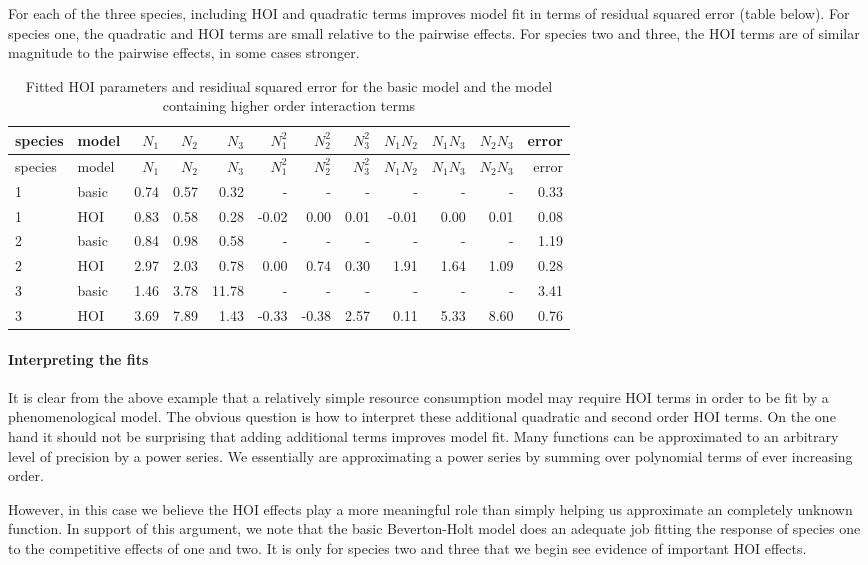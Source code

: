 \documentclass[12pt,]{article}
\let\oldparagraph\paragraph
\renewcommand{\paragraph}[1]{\oldparagraph{#1}\mbox{}}
\begin{document}
For each of the three species, including HOI and quadratic terms
improves model fit in terms of residual squared error (table below). For
species one, the quadratic and HOI terms are small relative to the
pairwise effects. For species two and three, the HOI terms are of
similar magnitude to the pairwise effects, in some cases stronger.

\begin{longtable}[]{@{}llrrrrrrrrrr@{}}
\caption{Fitted HOI parameters and residiual squared error for the basic
model and the model containing higher order interaction
terms}\tabularnewline
\toprule
species & model & \(N_1\) & \(N_2\) & \(N_3\) & \(N_1^2\) & \(N_2^2\) &
\(N_3^2\) & \(N_1N_2\) & \(N_1N_3\) & \(N_2N_3\) & error\tabularnewline
\midrule
\endfirsthead
\toprule
species & model & \(N_1\) & \(N_2\) & \(N_3\) & \(N_1^2\) & \(N_2^2\) &
\(N_3^2\) & \(N_1N_2\) & \(N_1N_3\) & \(N_2N_3\) & error\tabularnewline
\midrule
\endhead
1 & basic & 0.74 & 0.57 & 0.32 & - & - & - & - & - & - &
0.33\tabularnewline
1 & HOI & 0.83 & 0.58 & 0.28 & -0.02 & 0.00 & 0.01 & -0.01 & 0.00 & 0.01
& 0.08\tabularnewline
2 & basic & 0.84 & 0.98 & 0.58 & - & - & - & - & - & - &
1.19\tabularnewline
2 & HOI & 2.97 & 2.03 & 0.78 & 0.00 & 0.74 & 0.30 & 1.91 & 1.64 & 1.09 &
0.28\tabularnewline
3 & basic & 1.46 & 3.78 & 11.78 & - & - & - & - & - & - &
3.41\tabularnewline
3 & HOI & 3.69 & 7.89 & 1.43 & -0.33 & -0.38 & 2.57 & 0.11 & 5.33 & 8.60
& 0.76\tabularnewline
\bottomrule
\end{longtable}

\paragraph{Interpreting the fits}\label{interpreting-the-fits}

It is clear from the above example that a relatively simple resource
consumption model may require HOI terms in order to be fit by a
phenomenological model. The obvious question is how to interpret these
additional quadratic and second order HOI terms. On the one hand it
should not be surprising that adding additional terms improves model
fit. Many functions can be approximated to an arbitrary level of
precision by a power series. We essentially are approximating a power
series by summing over polynomial terms of ever increasing order.

However, in this case we believe the HOI effects play a more meaningful
role than simply helping us approximate an completely unknown function.
In support of this argument, we note that the basic Beverton-Holt model
does an adequate job fitting the response of species one to the
competitive effects of one and two. It is only for species two and three
that we begin see evidence of important HOI effects.
\end{document}
